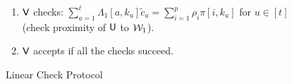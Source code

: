 \begin{figure}[t!]
{\begin{framed}
\begin{enumerate}[{\rm 1.}]
\begin{enumerate}
$v_u=\sum_{i=1}^pR^i(\alpha_{j_u},\eta_{k_u})X_u[i]$ (check consistency of $P$ with $\pi$).
\item $\innerproduct(\mathsf{pp},1^m,\mathsf{cm},r^Tb;z)$ where $z=\beta P_0+\overline{P}\varphi$ and $\mathsf{cm}=\beta c_0+\sum_{a=1}^{s+\ell}\varphi_ac_a$ (check the condition $r^TAw=r^Tb$).
\item $\innerproduct(\mathsf{pp},f_u^T\Lambda_2,C_u,\innp{\delta}{X_u})$ for $u\in [t]$ 
where $C_u=\sum_{i=1}^p\delta_i\pi[i,k_u]$ (consistency of $X_u$ with $\pi$). 
\end{enumerate}
\item $\mathsf{V}$ checks: $\sum_{a=1}^\ell\Lambda_1[a,k_u]\tilde{c}_a=\sum_{i=1}^p\rho_i\pi[i,k_u]$ for $u\in [t]$ (check proximity of $\mathsf{U}$ to $\mathcal{W}_1$).
\item $\mathsf{V}$ accepts if all the checks succeed.
\end{enumerate}
\end{framed}
\caption{Linear Check Protocol}
\label{fig:linearcheck}
}
\end{figure}

